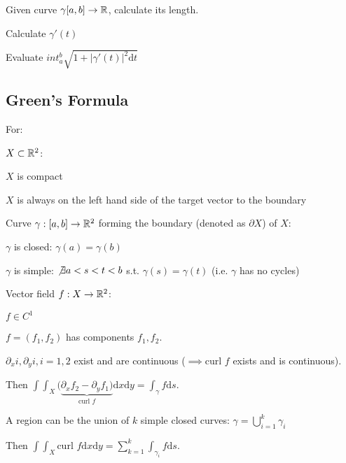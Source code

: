 Given curve $\gamma [a, b] \to \mathbb{R}$, calculate its length.

\begin{compactenum}
    \item Calculate $\gamma'(t)$
    \item Evaluate $int_a^b \sqrt{1 + |\gamma'(t)|^2 \mathrm{d}t}$
\end{compactenum}

\subsection{Green's Formula}
For:
\begin{compactenum}
    \item $X \subset \mathbb{R}^2$:
        \begin{compactitem}
            \item $X$ is compact
            \item $X$ is always on the left hand side of the target vector to the boundary
        \end{compactitem}
    \item Curve $\gamma: [a, b] \to \mathbb{R}^2$ forming the boundary (denoted as $\partial X$) of $X$:
        \begin{compactitem}
            \item $\gamma$ is closed: $\gamma(a) = \gamma(b)$
            \item $\gamma$ is simple: $\not\exists a < s < t < b$ s.t. $\gamma(s) = \gamma(t)$ (i.e. $\gamma$ has no cycles)
        \end{compactitem}
    \item Vector field $f: X \to \mathbb{R}^2$:
        \begin{compactitem}
            \item $f \in C^1$
            \item $f = (f_1, f_2)$ has components $f_1, f_2$.
            \item $\partial_x i, \partial_y i, i = 1, 2$ exist and are continuous ($\implies \text{curl }f$ exists and is continuous).
        \end{compactitem}
\end{compactenum}

Then $\int\int_X(\underbrace{\partial_x f_2 - \partial_y f_1)}_{\text{curl }f} \mathrm{d}x\mathrm{d}y = \int_{\gamma} f \mathrm{d}s$.

\begin{compactitem}
    \item A region can be the union of $k$ simple closed curves: $\gamma = \bigcup_{i = 1}^k \gamma_i$
        \begin{compactitem}
            \item Then $\int\int_X \text{curl }f \mathrm{d}x\mathrm{d}y = \sum_{k=1}^k \int_{\gamma_i} f \mathrm{d}s$.
        \end{compactitem}
\end{compactitem}

